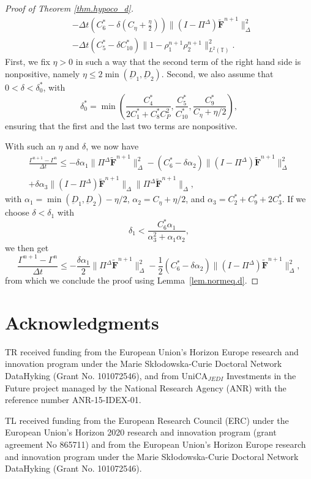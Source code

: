 \documentclass[reqno]{amsart}
\newcommand{\T}{\mathbb{T}}
\newcommand{\Ft}{{\widetilde{F}}}
\newcommand{\Ftbf}{\mathbf{\Ft}}
\numberwithin{equation}{section}
\begin{document}
\begin{proof}[Proof of Theorem \ref{thm.hypoco_d}]
\begin{align*}
        &-\Delta t\left(C_6^*-\delta\left(C_\eta+\frac{\eta}{2}\right)\right)\|(I-\Pi^\Delta)\Ftbf^{n+1}\|_\Delta^2\\
        &-\Delta t\left(C_5^*-\delta C_{10}^*\right)\|1-\rho_1^{n+1}\rho_2^{n+1}\|_{L^2(\T)}^2.
    \end{align*}
     First, we fix $\eta >0$ in such a way that the second term of the right hand side is nonpositive, namely $\eta \leq 2 \min(\underbar{D}_1,\underbar{D}_2)$. Second, we also assume that $0<\delta<\delta_0^*$, with
    \[
    \delta_0^*=\min\left(\frac{C_{4}^*}{2C_1^*+C_{8}^*C_P^2},\frac{C_5^*}{C_{10}^*},\frac{C_{9}^*}{C_\eta+\eta/2}\right), 
    \]
    ensuring that the first and the last two terms are nonpositive.
    
    With such an $\eta$ and $\delta$, we now have
    \begin{gather*}
        \frac{\Gamma^{n+1}-\Gamma^n}{\Delta t}\leq  -\delta\alpha_1\|\Pi^\Delta\Ftbf^{n+1}\|_\Delta^2 - \left(C_6^*-\delta \alpha_2\right)\|(I-\Pi^\Delta)\Ftbf^{n+1}\|_\Delta^2\\
        +\delta\alpha_3 \|(I-\Pi^\Delta)\Ftbf^{n+1}\|_\Delta\|\Pi^\Delta\Ftbf^{n+1}\|_\Delta,
    \end{gather*} 
    with $\alpha_1=\min(\underbar{D}_1,\underbar{D}_2)-\eta/2$, $\alpha_2=C_\eta+\eta/2$, and $\alpha_3=C_2^*+C_9^*+2C_{3}^*$. If we choose $\delta<\delta_1$ with
    \[
    \delta_1<\frac{C_6^*\alpha_1}{\alpha_3^2+\alpha_1\alpha_2},
    \]
    we then get
    \[
    \frac{\Gamma^{n+1}-\Gamma^n}{\Delta t}\leq- \frac{\delta\alpha_1}{2}\|\Pi^\Delta\Ftbf^{n+1}\|_\Delta^{2}-\frac{1}{2}(C_6^*-\delta\alpha_2)\|(I-\Pi^\Delta)\Ftbf^{n+1}\|_\Delta^2,
    \]
    from which we conclude the proof using Lemma~\ref{lem.normeq.d}.
\end{proof}

\section*{Acknowledgments}
TR received funding from the European Union's Horizon Europe research and innovation program under the Marie Skłodowska-Curie Doctoral Network DataHyking (Grant No. 101072546), and from UniCA$_{JEDI}$ Investments in the Future project managed by the National Research Agency (ANR) with the reference number ANR-15-IDEX-01.	 

TL received funding from the European Research Council (ERC) under the European Union’s Horizon 2020 research and innovation program (grant agreement No 865711) and from the European Union's Horizon Europe research and innovation program under the Marie Skłodowska-Curie Doctoral Network DataHyking (Grant No. 101072546).
\end{document}
